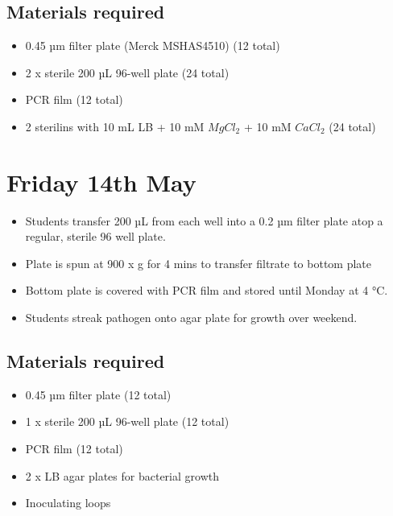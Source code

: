 \documentclass[
]{book}
\providecommand{\tightlist}{%
  \setlength{\itemsep}{0pt}\setlength{\parskip}{0pt}}
\begin{document}
\hypertarget{materials-required-3}{%
\subsection{Materials required}\label{materials-required-3}}

\begin{itemize}
\tightlist
\item
  0.45 µm filter plate (Merck MSHAS4510) (12 total)
\item
  2 x sterile 200 µL 96-well plate (24 total)
\item
  PCR film (12 total)
\item
  2 sterilins with 10 mL LB + 10 mM \(MgCl_{2}\) + 10 mM \(CaCl_{2}\) (24 total)
\end{itemize}

\hypertarget{friday-14th-may}{%
\section{Friday 14th May}\label{friday-14th-may}}

\begin{itemize}
\tightlist
\item
  Students transfer 200 µL from each well into a 0.2 µm filter plate atop a regular, sterile 96 well plate.
\item
  Plate is spun at 900 x g for 4 mins to transfer filtrate to bottom plate
\item
  Bottom plate is covered with PCR film and stored until Monday at 4 °C.
\item
  Students streak pathogen onto agar plate for growth over weekend.
\end{itemize}

\hypertarget{materials-required-4}{%
\subsection{Materials required}\label{materials-required-4}}

\begin{itemize}
\tightlist
\item
  0.45 µm filter plate (12 total)
\item
  1 x sterile 200 µL 96-well plate (12 total)
\item
  PCR film (12 total)
\item
  2 x LB agar plates for bacterial growth
\item
  Inoculating loops
\end{itemize}
\end{document}
